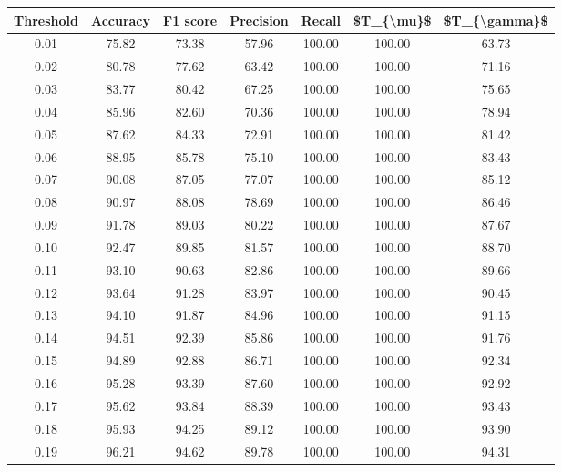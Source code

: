 \begin{tabular}{|c|c|c|c|c|c|c|}
\hline
 Threshold &  Accuracy &  F1 score &  Precision &  Recall &  \$T\_\{\textbackslash mu\}\$ &  \$T\_\{\textbackslash gamma\}\$ \\
\hline
      0.01 &     75.82 &     73.38 &      57.96 &  100.00 &     100.00 &         63.73 \\
      0.02 &     80.78 &     77.62 &      63.42 &  100.00 &     100.00 &         71.16 \\
      0.03 &     83.77 &     80.42 &      67.25 &  100.00 &     100.00 &         75.65 \\
      0.04 &     85.96 &     82.60 &      70.36 &  100.00 &     100.00 &         78.94 \\
      0.05 &     87.62 &     84.33 &      72.91 &  100.00 &     100.00 &         81.42 \\
      0.06 &     88.95 &     85.78 &      75.10 &  100.00 &     100.00 &         83.43 \\
      0.07 &     90.08 &     87.05 &      77.07 &  100.00 &     100.00 &         85.12 \\
      0.08 &     90.97 &     88.08 &      78.69 &  100.00 &     100.00 &         86.46 \\
      0.09 &     91.78 &     89.03 &      80.22 &  100.00 &     100.00 &         87.67 \\
      0.10 &     92.47 &     89.85 &      81.57 &  100.00 &     100.00 &         88.70 \\
      0.11 &     93.10 &     90.63 &      82.86 &  100.00 &     100.00 &         89.66 \\
      0.12 &     93.64 &     91.28 &      83.97 &  100.00 &     100.00 &         90.45 \\
      0.13 &     94.10 &     91.87 &      84.96 &  100.00 &     100.00 &         91.15 \\
      0.14 &     94.51 &     92.39 &      85.86 &  100.00 &     100.00 &         91.76 \\
      0.15 &     94.89 &     92.88 &      86.71 &  100.00 &     100.00 &         92.34 \\
      0.16 &     95.28 &     93.39 &      87.60 &  100.00 &     100.00 &         92.92 \\
      0.17 &     95.62 &     93.84 &      88.39 &  100.00 &     100.00 &         93.43 \\
      0.18 &     95.93 &     94.25 &      89.12 &  100.00 &     100.00 &         93.90 \\
      0.19 &     96.21 &     94.62 &      89.78 &  100.00 &     100.00 &         94.31 \\

\end{tabular}
